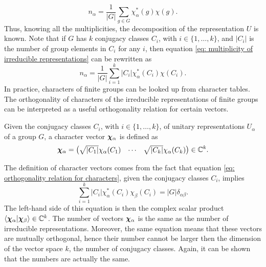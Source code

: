 \begin{equation}
\label{eq: multiplicity of irreducible representations}
    n_\alpha = \frac{1}{|G|}\sum_{g \in G}\chi_\alpha^*(g)\chi(g).
\end{equation}
Thus, knowing all the multiplicities, the decomposition of the representation $U$ is known. Note that if $G$ has $k$ conjugacy classes $C_i$, with $i \in \{1,\dots,k\}$, and $|C_i|$ is the number of group elements in $C_i$ for any $i$, then equation \eqref{eq: multiplicity of irreducible representations} can be rewritten as
\begin{equation}
\label{eq: multiplicity of irreducible representations in terms of conjugacy classes}
    n_\alpha = \frac{1}{|G|}\sum_{i = 1}^k|C_i|\chi_\alpha^*(C_i)\chi(C_i).
\end{equation}
In practice, characters of finite groups can be looked up from character tables. The orthogonality of characters of the irreducible representations of finite groups can be interpreted as a useful orthogonality relation for certain vectors.
\begin{defn}
    Given the conjugacy classes $C_i$, with $i \in \{1,\dots,k\}$, of unitary representations $U_\alpha$ of a group $G$, a character vector $\bm{\chi}_\alpha$ is defined as 
    \begin{equation}
    \label{eq: character vector}
        \bm{\chi}_\alpha = 
        \begin{pmatrix}
            \sqrt{|C_1|}\chi_\alpha(C_1) & \cdots & \sqrt{|C_k|}\chi_\alpha(C_k)
        \end{pmatrix} 
        \in \mathbb{C}^k.
    \end{equation}
\end{defn}
The definition of character vectors comes from the fact that equation \eqref{eq: orthogonality relation for characters}, given the conjugacy classes $C_i$, implies 
\begin{equation}
\label{eq: orthogonality relation for characters in terms of conjugacy classes}
    \sum_{i=1}^k|C_i|\chi_\alpha^*(C_i)\chi_\beta(C_i) = |G|\delta_{\alpha\beta}.
\end{equation}
The left-hand side of this equation is then the complex scalar product $\langle \bm{\chi}_\alpha | \bm{\chi}_\beta \rangle \in \mathbb{C}^k$. The number of vectors $\bm{\chi}_\alpha$ is the same as the number of irreducible representations. Moreover, the same equation means that these vectors are mutually orthogonal, hence their number cannot be larger then the dimension of the vector space $k$, the number of conjugacy classes. Again, it can be shown that the numbers are actually the same.
